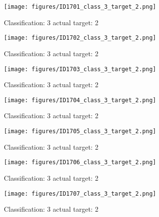 \begin{figure}[h!]
\begin{center}
\texttt{[image: figures/ID1701\_class\_3\_target\_2.png]}
\end{center}
\caption{ Classification: 3 actual target: 2}
\label{fig:ID1701_class_3_target_2}
\end{figure}
\begin{figure}[h!]
\begin{center}
\texttt{[image: figures/ID1702\_class\_3\_target\_2.png]}
\end{center}
\caption{ Classification: 3 actual target: 2}
\label{fig:ID1702_class_3_target_2}
\end{figure}
\begin{figure}[h!]
\begin{center}
\texttt{[image: figures/ID1703\_class\_3\_target\_2.png]}
\end{center}
\caption{ Classification: 3 actual target: 2}
\label{fig:ID1703_class_3_target_2}
\end{figure}
\begin{figure}[h!]
\begin{center}
\texttt{[image: figures/ID1704\_class\_3\_target\_2.png]}
\end{center}
\caption{ Classification: 3 actual target: 2}
\label{fig:ID1704_class_3_target_2}
\end{figure}
\begin{figure}[h!]
\begin{center}
\texttt{[image: figures/ID1705\_class\_3\_target\_2.png]}
\end{center}
\caption{ Classification: 3 actual target: 2}
\label{fig:ID1705_class_3_target_2}
\end{figure}
\begin{figure}[h!]
\begin{center}
\texttt{[image: figures/ID1706\_class\_3\_target\_2.png]}
\end{center}
\caption{ Classification: 3 actual target: 2}
\label{fig:ID1706_class_3_target_2}
\end{figure}
\begin{figure}[h!]
\begin{center}
\texttt{[image: figures/ID1707\_class\_3\_target\_2.png]}
\end{center}
\caption{ Classification: 3 actual target: 2}
\label{fig:ID1707_class_3_target_2}
\end{figure}
